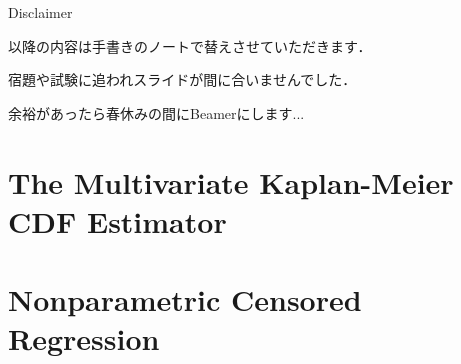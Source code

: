 \documentclass[xcolor=svgnames,dvipdfmx,cjk]{beamer}
\theoremstyle{example}
\begin{document}
\begin{frame}{Disclaimer}
      \begin{center}
            以降の内容は手書きのノートで替えさせていただきます．

            宿題や試験に追われスライドが間に合いませんでした．
            
            余裕があったら春休みの間にBeamerにします...
      \end{center}
\end{frame}



\section{The Multivariate Kaplan-Meier CDF Estimator}







\section{Nonparametric Censored Regression}










\end{document}
